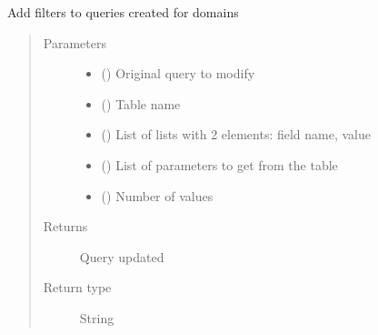 \documentclass[letterpaper,10pt,english]{sphinxmanual}
\begin{document}

\begin{fulllineitems}
\label{\detokenize{CE_app.synth_phr:CE_app.synth_phr.functions.func_nihpo_add_filters_to_query}}
\sphinxAtStartPar
Add filters to queries created for domains
\begin{quote}\begin{description}
\item[{Parameters}] \leavevmode\begin{itemize}
\item {} 
\sphinxAtStartPar
{} () \textendash{} Original query to modify

\item {} 
\sphinxAtStartPar
{} () \textendash{} Table name

\item {} 
\sphinxAtStartPar
{} () \textendash{} List of lists with 2 elements: field name, value

\item {} 
\sphinxAtStartPar
{} () \textendash{} List of parameters to get from the table

\item {} 
\sphinxAtStartPar
{} () \textendash{} Number of values

\end{itemize}

\item[{Returns}] \leavevmode
\sphinxAtStartPar
Query updated

\item[{Return type}] \leavevmode
\sphinxAtStartPar
String

\end{description}\end{quote}

\end{fulllineitems}
\end{document}
